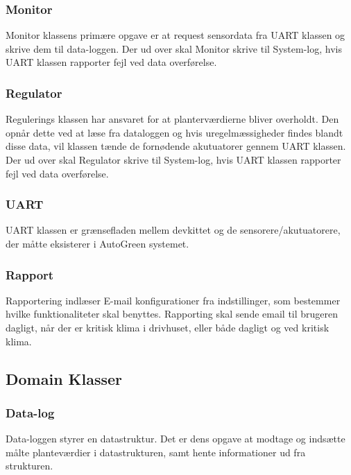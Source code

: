 \subsubsection{Monitor}

Monitor klassens primære opgave er at request sensordata fra UART klassen og skrive dem til data-loggen. Der ud over skal Monitor skrive til System-log, hvis UART klassen rapporter fejl ved data overførelse.

\subsubsection{Regulator}

Regulerings klassen har ansvaret for at planterværdierne bliver overholdt. Den opnår dette ved at læse fra dataloggen og hvis uregelmæssigheder findes blandt disse data, vil klassen tænde de fornødende akutuatorer gennem UART klassen. Der ud over skal Regulator skrive til System-log, hvis UART klassen rapporter fejl ved data overførelse.

\subsubsection{UART}

UART klassen er grænsefladen mellem devkittet og de sensorere/akutuatorere, der måtte eksisterer i AutoGreen systemet.

\subsubsection{Rapport}

Rapportering indlæser E-mail konfigurationer fra indstillinger, som bestemmer hvilke funktionaliteter skal benyttes. Rapporting skal sende email til brugeren dagligt, når der er kritisk klima i drivhuset, eller både dagligt og ved kritisk klima. 

\subsection{Domain Klasser}

\subsubsection{Data-log}

Data-loggen styrer en datastruktur. Det er dens opgave at modtage og indsætte målte planteværdier i datastrukturen, samt hente informationer ud fra strukturen.


